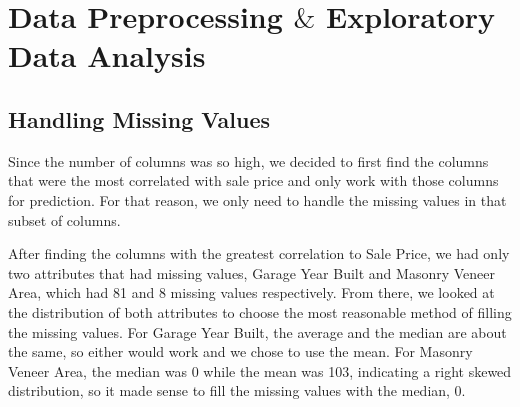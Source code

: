 \documentclass[fleqn,10pt]{SelfArx} %
\begin{document}
\section{Data Preprocessing $\&$ Exploratory Data Analysis} %

\subsection{Handling Missing Values}
Since the number of columns was so high, we decided to first find the columns that were the most correlated with sale price and only work with those columns for prediction. For that reason, we only need to handle the missing values in that subset of columns. 

After finding the columns with the greatest correlation to Sale Price, we had only two attributes that had missing values, Garage Year Built and Masonry Veneer Area, which had 81 and 8 missing values respectively. From there, we looked at the distribution of both attributes to choose the most reasonable method of filling the missing values. For Garage Year Built, the average and the median are about the same, so either would work and we chose to use the mean. For Masonry Veneer Area, the median was 0 while the mean was 103, indicating a right skewed distribution, so it made sense to fill the missing values with the median, 0. 

\bigskip
\bigskip
\end{document}
